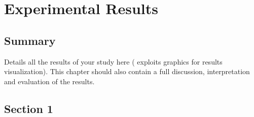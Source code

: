 
\chapter{Experimental Results
}
\label{chap:er1}
\ifpdf
    \graphicspath{{Chapter4/Figures/PNG/}{Chapter3/Figures/PDF/}{Chapter4/Figures/}}
\else
    \graphicspath{{Chapter4/Figures/EPS/}{Chapter3/Figures/}}
\fi


\section*{Summary}
Details all the results of your study here ( exploits graphics for results visualization). 
This chapter should also contain a full discussion, interpretation and evaluation of the results. 



\section{Section 1} 
\label{sec:gv2}

